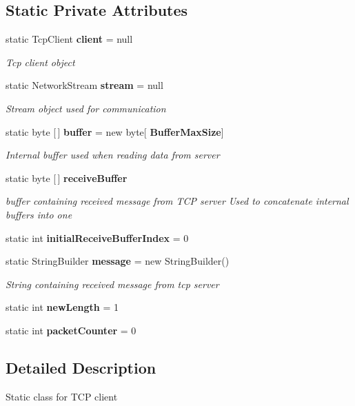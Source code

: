 \subsection*{Static Private Attributes}
\begin{DoxyCompactItemize}
\item 
static Tcp\+Client \textbf{ client} = null
\begin{DoxyCompactList}\small\item\em Tcp client object \end{DoxyCompactList}\item 
static Network\+Stream \textbf{ stream} = null
\begin{DoxyCompactList}\small\item\em Stream object used for communication \end{DoxyCompactList}\item 
static byte [$\,$] \textbf{ buffer} = new byte[\textbf{ Buffer\+Max\+Size}]
\begin{DoxyCompactList}\small\item\em Internal buffer used when reading data from server \end{DoxyCompactList}\item 
static byte [$\,$] \textbf{ receive\+Buffer}
\begin{DoxyCompactList}\small\item\em buffer containing received message from T\+CP server Used to concatenate internal buffers into one \end{DoxyCompactList}\item 
static int \textbf{ initial\+Receive\+Buffer\+Index} = 0
\item 
static String\+Builder \textbf{ message} = new String\+Builder()
\begin{DoxyCompactList}\small\item\em String containing received message from tcp server \end{DoxyCompactList}\item 
static int \textbf{ new\+Length} = 1
\item 
static int \textbf{ packet\+Counter} = 0
\end{DoxyCompactItemize}


\subsection{Detailed Description}
Static class for T\+CP client 



